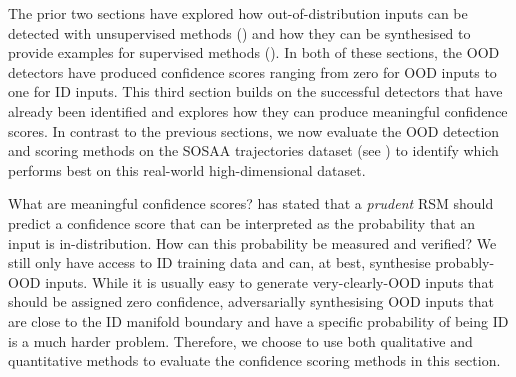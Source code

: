 The prior two sections have explored how out-of-distribution inputs can be detected with unsupervised methods () and how they can be synthesised to provide examples for supervised methods (). In both of these sections, the OOD detectors have produced confidence scores ranging from zero for OOD inputs to one for ID inputs. This third section builds on the successful detectors that have already been identified and explores how they can produce meaningful confidence scores. In contrast to the previous sections, we now evaluate the OOD detection and scoring methods on the SOSAA trajectories dataset (see ) to identify which performs best on this real-world high-dimensional dataset.

What are meaningful confidence scores?  has stated that a \textit{prudent} RSM should predict a confidence score that can be interpreted as the probability that an input is in-distribution. How can this probability be measured and verified? We still only have access to ID training data and can, at best, synthesise probably-OOD inputs. While it is usually easy to generate very-clearly-OOD inputs that should be assigned zero confidence, adversarially synthesising OOD inputs that are close to the ID manifold boundary and have a specific probability of being ID is a much harder problem. Therefore, we choose to use both qualitative and quantitative methods to evaluate the confidence scoring methods in this section.

